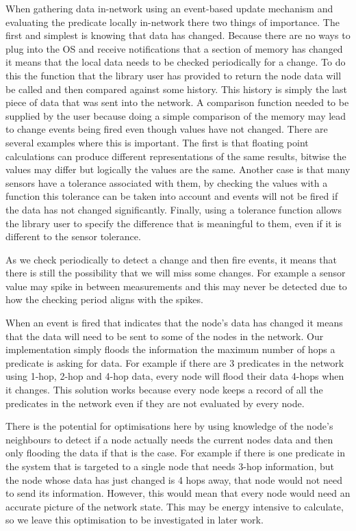 When gathering data in-network using an event-based update mechanism and evaluating the predicate locally in-network there two things of importance. The first and simplest is knowing that data has changed. Because there are no ways to plug into the OS and receive notifications that a section of memory has changed it means that the local data needs to be checked periodically for a change. To do this the function that the library user has provided to return the node data will be called and then compared against some history. This history is simply the last piece of data that was sent into the network. A comparison function needed to be supplied by the user because doing a simple comparison of the memory may lead to change events being fired even though values have not changed. There are several examples where this is important. The first is that floating point calculations can produce different representations of the same results, bitwise the values may differ but logically the values are the same. Another case is that many sensors have a tolerance associated with them, by checking the values with a function this tolerance can be taken into account and events will not be fired if the data has not changed significantly. Finally, using a tolerance function allows the library user to specify the difference that is meaningful to them, even if it is different to the sensor tolerance.

As we check periodically to detect a change and then fire events, it means that there is still the possibility that we will miss some changes. For example a sensor value may spike in between measurements and this may never be detected due to how the checking period aligns with the spikes.

When an event is fired that indicates that the node's data has changed it means that the data will need to be sent to some of the nodes in the network. Our implementation simply floods the information the maximum number of hops a predicate is asking for data. For example if there are 3 predicates in the network using 1-hop, 2-hop and 4-hop data, every node will flood their data 4-hops when it changes. This solution works because every node keeps a record of all the predicates in the network even if they are not evaluated by every node.

There is the potential for optimisations here by using knowledge of the node's neighbours to detect if a node actually needs the current nodes data and then only flooding the data if that is the case. For example if there is one predicate in the system that is targeted to a single node that needs 3-hop information, but the node whose data has just changed is 4 hops away, that node would not need to send its information. However, this would mean that every node would need an accurate picture of the network state. This may be energy intensive to calculate, so we leave this optimisation to be investigated in later work.

